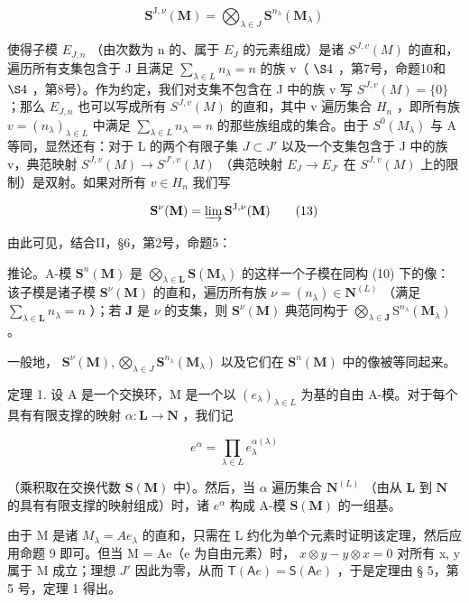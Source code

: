 \[
\mathbf {S} ^ {\mathrm{J}, \nu} (\mathbf {M}) = \bigotimes_ {\lambda \in J} \mathbf {S} ^ {n _ {\lambda}} (\mathbf {M} _ {\lambda})\tag{12}
\]

使得子模 \(E_{J,n}\) （由次数为 n 的、属于 \(E_{J}\) 的元素组成）是诸 \(S^{J,v}(M)\) 的直和，遍历所有支集包含于 J 且满足 \(\sum_{\lambda\in L}n_{\lambda}=n\) 的族 v（ \(\S4\) ，第7号，命题10和 \(\S4\) ，第8号）。作为约定，我们对支集不包含在 J 中的族 v 写 \(S^{J,v}(M)=\{0\}\) ；那么 \(E_{J,n}\) 也可以写成所有 \(S^{J,v}(M)\) 的直和，其中 v 遍历集合 \(H_{n}\) ，即所有族 \(v=(n_{\lambda})_{\lambda\in L}\) 中满足 \(\sum_{\lambda\in L}n_{\lambda}=n\) 的那些族组成的集合。由于 \(S^{0}(M_{\lambda})\) 与 A 等同，显然还有：对于 L 的两个有限子集 \(J\subset J'\) 以及一个支集包含于 J 中的族 v，典范映射 \(S^{J,v}(M)\to S^{J',v}(M)\) （典范映射 \(E_{J}\to E_{J'}\) 在 \(S^{J,v}(M)\) 上的限制）是双射。如果对所有 \(v\in H_{n}\) 我们写

\[
\mathbf {S} ^ {\nu} (\mathbf {M}) = \varinjlim \mathbf {S} ^ {\mathrm{J}, \nu} (\mathbf {M})\tag{13}
\]

由此可见，结合II，§6，第2号，命题5：

推论。A-模 \(\mathbf{S}^n (\mathbf{M})\) 是 \(\bigotimes_{\lambda \in \mathbf{L}}\mathbf{S}(\mathbf{M}_{\lambda})\) 的这样一个子模在同构 (10) 下的像：该子模是诸子模 \(\mathbf{S}^{\nu}(\mathbf{M})\) 的直和，遍历所有族 \(\nu = (n_{\lambda})\in \mathbf{N}^{(L)}\) （满足 \(\sum_{\lambda \in \mathbf{L}}n_{\lambda} = n\) ）；若 \(\mathbf{J}\) 是 \(\nu\) 的支集，则 \(\mathbf{S}^{\nu}(\mathbf{M})\) 典范同构于 \(\bigotimes_{\lambda \in \mathbf{J}}\mathrm{S}^{n_{\lambda}}(\mathbf{M}_{\lambda})\) 。

一般地， \(\mathbf{S}^{\nu}(\mathbf{M}),\bigotimes_{\lambda \in J}\mathbf{S}^{n_{\lambda}}(\mathbf{M}_{\lambda})\) 以及它们在 \(\mathbf{S}^n (\mathbf{M})\) 中的像被等同起来。

定理 1. 设 A 是一个交换环，M 是一个以 \((e_{\lambda})_{\lambda \in L}\) 为基的自由 A-模。对于每个具有有限支撑的映射 \(\alpha: \mathbf{L} \to \mathbf{N}\) ，我们记

\[
e ^ {\alpha} = \prod_ {\lambda \in L} e _ {\lambda} ^ {\alpha (\lambda)}\tag{14}
\]

（乘积取在交换代数 \(\mathbf{S}(\mathbf{M})\) 中）。然后，当 \(\alpha\) 遍历集合 \(\mathbf{N}^{(L)}\) （由从 \(\mathbf{L}\) 到 \(\mathbf{N}\) 的具有有限支撑的映射组成）时，诸 \(e^{\alpha}\) 构成 A-模 \(\mathbf{S}(\mathbf{M})\) 的一组基。

由于 M 是诸 \(M_{\lambda} = Ae_{\lambda}\) 的直和，只需在 L 约化为单个元素时证明该定理，然后应用命题 9 即可。但当 M = Ae（e 为自由元素）时， \(x \otimes y - y \otimes x = 0\) 对所有 x, y 属于 M 成立；理想 \(J'\) 因此为零，从而 \(\mathsf{T}(\mathsf{A}e) = \mathsf{S}(\mathsf{A}e)\) ，于是定理由 § 5，第 5 号，定理 1 得出。

